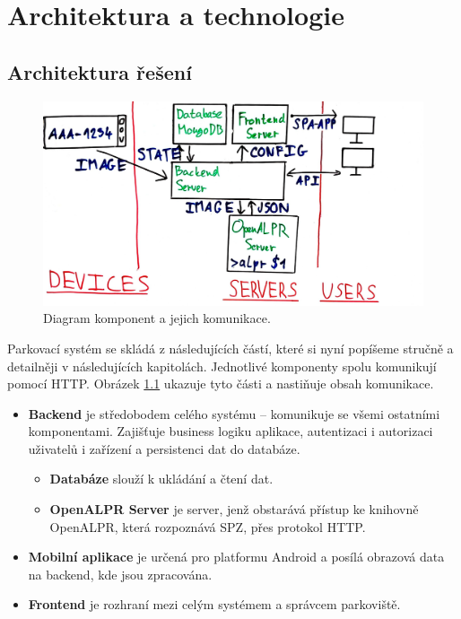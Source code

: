 
\chapter{Architektura a technologie} \label{archtech}

\section{Architektura řešení} \label{architektura_reseni}

\begin{figure} \centering
  \includegraphics[width=145mm]{../img/architecture_drawing.jpg}
  \caption{Diagram komponent a jejich komunikace.}
  \label{fig:architecture_drawing}
\end{figure}

Parkovací systém se skládá z následujících částí, které si nyní popíšeme stručně a detailněji v
následujících kapitolách.
Jednotlivé komponenty spolu komunikují pomocí HTTP.
Obrázek \ref{fig:architecture_drawing} ukazuje tyto části a nastiňuje obsah komunikace.

\begin{itemize}
  \setlength\itemsep{.05em}
  \item \textbf{Backend} je středobodem celého systému -- komunikuje se všemi ostatními komponentami.
  Zajišťuje business logiku aplikace, autentizaci i autorizaci uživatelů i zařízení
  a persistenci dat do databáze.
  \begin{itemize}
    \setlength\itemsep{.05em}
    \item \textbf{Databáze} slouží k ukládání a čtení dat.
    \item \textbf{OpenALPR Server} je server, jenž obstarává přístup
          ke knihovně OpenALPR, která rozpoznává SPZ, přes protokol HTTP.
  \end{itemize}
  \item \textbf{Mobilní aplikace} je určená pro platformu Android a posílá obrazová data na backend,
        kde jsou zpracována.
  \item \textbf{Frontend} je rozhraní mezi celým systémem a správcem parkoviště.
\end{itemize}

